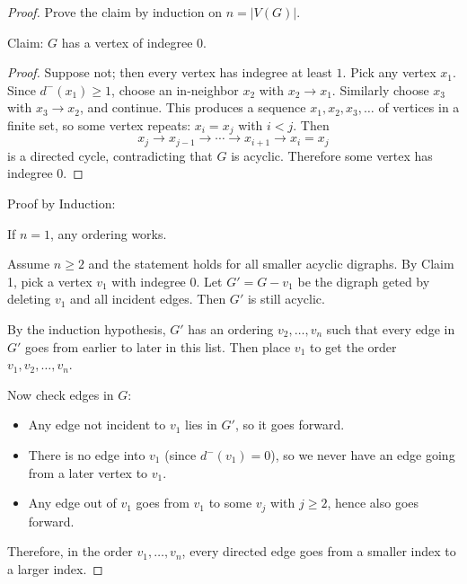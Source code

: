 \documentclass[11pt]{article}
\begin{document}
\begin{proof}
Prove the claim by induction on $n=|V(G)|$.

\medskip
\noindent Claim: $G$ has a vertex of indegree $0$.

\begin{proof}
    Suppose not; then every vertex has indegree at least $1$.
Pick any vertex $x_1$. Since $d^-(x_1)\ge 1$, choose an in-neighbor $x_2$ with $x_2\to x_1$.
Similarly choose $x_3$ with $x_3\to x_2$, and continue. This produces a sequence
$x_1,x_2,x_3,\dots$ of vertices in a finite set, so some vertex repeats: $x_i=x_j$ with $i<j$.
Then
\[
x_j \to x_{j-1} \to \cdots \to x_{i+1} \to x_i=x_j
\]
is a directed cycle, contradicting that $G$ is acyclic. Therefore some vertex has indegree $0$.
\end{proof}

\medskip
\noindent Proof by Induction:

If $n=1$, any ordering works.

Assume $n\ge 2$ and the statement holds for all smaller acyclic digraphs.
By Claim 1, pick a vertex $v_1$ with indegree $0$. Let $G' = G - v_1$ be the digraph geted by deleting $v_1$
and all incident edges. Then $G'$ is still acyclic.

By the induction hypothesis, $G'$ has an ordering $v_2,\dots,v_n$ such that every edge in $G'$
goes from earlier to later in this list. Then place $v_1$ to get the order $v_1,v_2,\dots,v_n$.

Now check edges in $G$:
\begin{itemize}
\item Any edge not incident to $v_1$ lies in $G'$, so it goes forward.
\item There is no edge into $v_1$ (since $d^-(v_1)=0$), so we never have an edge going from a later vertex to $v_1$.
\item Any edge out of $v_1$ goes from $v_1$ to some $v_j$ with $j\ge 2$, hence also goes forward.
\end{itemize}
Therefore, in the order $v_1,\dots,v_n$, every directed edge goes from a smaller index to a larger index.
\end{proof}

\newpage
\end{document}
